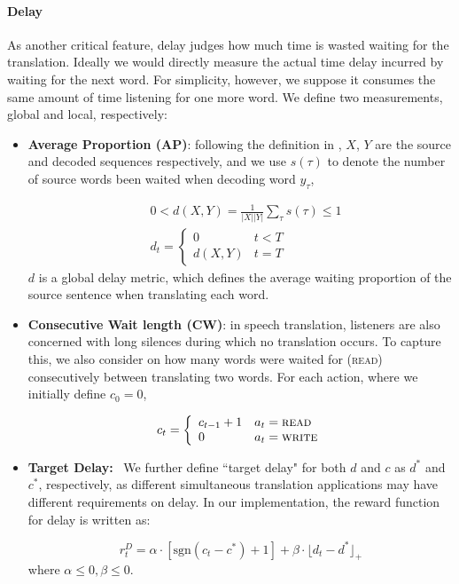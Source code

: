 \paragraph{Delay}As another critical feature, delay judges how much time is wasted waiting for the translation. Ideally we would directly measure the actual time delay incurred by waiting for the next word. For simplicity, however, we suppose it consumes the same amount of time listening  for one more word. We define two measurements, global and local, respectively:

\begin{itemize}[leftmargin=*]
    \item \textbf{Average Proportion (AP)}: following the definition in \cite{cho2016can}, $X$, $Y$ are the source and decoded sequences respectively, and we use $s(\tau)$ to denote the number of source words been waited when decoding word $y_\tau$, 

    \begin{equation}
    \begin{split}
        &0 < d\left(X, Y\right) = \frac{1}{|X||Y|}\sum_{\tau}{s(\tau)}\leq 1 \\
        &d_t = 
        \left\{\begin{array}{ll}
        0    &     t < T\\
        d(X, Y)  &     t = T
        \end{array} \right. 
    \end{split}
    \end{equation}
    $d$ is a global delay metric, which defines the average waiting proportion of the source sentence when translating each word.\vspace{-5pt}
    \item \textbf{Consecutive Wait length (CW)}: in speech translation, listeners are also concerned with long silences during which no translation occurs. To capture this, we also consider on how many words were waited for (\textsc{read}) consecutively between translating two words. For each action, where we initially define $c_0=0$,

    \begin{equation}
        c_t = 
        \left\{\begin{array}{ll}
        c_{t-1} + 1    &     a_t = \textsc{read}\\
        0             &      a_t = \textsc{write}
        \end{array} \right.         
    \end{equation}
\item \textbf{Target Delay:}~
We further define ``target delay" for both $d$ and $c$ as $d^*$ and $c^*$, respectively, as different simultaneous translation applications may have different requirements on delay. In our implementation, the reward function for delay is written as:

\begin{equation}
    \label{eq_rd}
    r_t^{D} = \alpha \cdot \left[\text{sgn}(c_t - c^*)+1\right] + \beta \cdot \lfloor d_t - d^* \rfloor_{+}
\end{equation}
where $\alpha \leq 0, \beta \leq 0$. 
\end{itemize}

